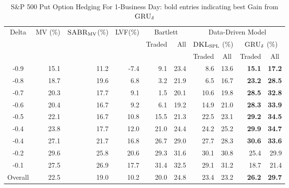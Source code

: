 \documentclass[letterpaper,12pt,titlepage,oneside,final]{book}
\numberwithin{equation}{section}
\theoremstyle{definition}
\newcommand{\model}{\textsc{GRU}_\delta}
\newcommand{\DKLs}{\bf\textsc{DKL}_{\text{SPL}}}
\newcommand{\LVF}{\textsc{LVF}}
\newcommand{\SABR}{\bf\textsc{SABR}_{\text{MV}}}
\begin{document}
\begin{table}[htp!]
\centering
\begin{threeparttable}
\begin{tabular}{|c |r r r r r r r r r|}
\hline
\multirow{3}{*}{Delta}&\multirow{3}{*}{MV (\%)}&\multirow{3}{*}{\;$\SABR$(\%)}&\multirow{3}{*}{\LVF (\%)}&\multicolumn{2}{c|}{Bartlett}& \multicolumn{4}{c|}{Data-Driven Model}\\
&&&&\multirow{2}{*}{Traded}&\multirow{2}{*}{All}&\multicolumn{2}{|c}{$\DKLs$ (\%)} &\multicolumn{2}{c|}{$\model$ (\%)}\\
&&&&&&\multicolumn{1}{|c}{\small Traded}&\multicolumn{1}{c}{\small All}&\multicolumn{1}{c}{\small Traded}&\multicolumn{1}{c|}{\small All}\\ \hline
  			-0.9 & 15.1    &11.2  &-7.4 &9.1  &23.4   &8.6    &13.6  &\textbf{15.1}    &\textbf{17.2} \\
			-0.8 & 18.7    &19.6  &6.8  &3.2  &21.9   &6.5    &16.7  &\textbf{23.2}    &\textbf{28.5} \\
			-0.7 & 20.3    &17.7  &9.1  &1.5  &20.1   &10.6   &19.8  &\textbf{28.5}    &\textbf{32.8} \\
			-0.6 & 20.4    &16.7  &9.2  &6.1  &19.2   &14.9   &21.0  &\textbf{28.3}    &\textbf{33.9} \\
			-0.5 & 22.1    &16.7  &10.8 &15.5 &21.3   &22.5   &23.1  &\textbf{29.2}    &\textbf{34.5} \\
			-0.4 & 23.8    &17.7  &12.0 &21.0 &24.4   &24.2   &25.2  &\textbf{29.9}    &\textbf{34.7} \\
			-0.4 & 27.1    &21.7  &16.8 &26.7 &29.0   &27.7   &28.3  &\textbf{30.6}    &\textbf{33.6} \\
			-0.2 & 29.6    &25.8  &20.6 &29.3 &31.6   &30.1   &30.8  &25.4    &29.9 \\
			-0.1 & 27.5    &26.9  &17.7 &31.4 &32.5   &29.1   &31.2  &18.7    &21.4 \\
			Overall &22.5  &19.0  &10.2 &20.0 &24.8   &23.4   &23.2  &\textbf{26.2}    &\textbf{29.7} \\
  \hline
\end{tabular}
\caption{S\&P 500 Put Option Hedging For 1-Business Day: bold entries indicating best Gain from $\model$  }
\label{SP500Put}

\end{threeparttable}
\end{table}
\end{document}
